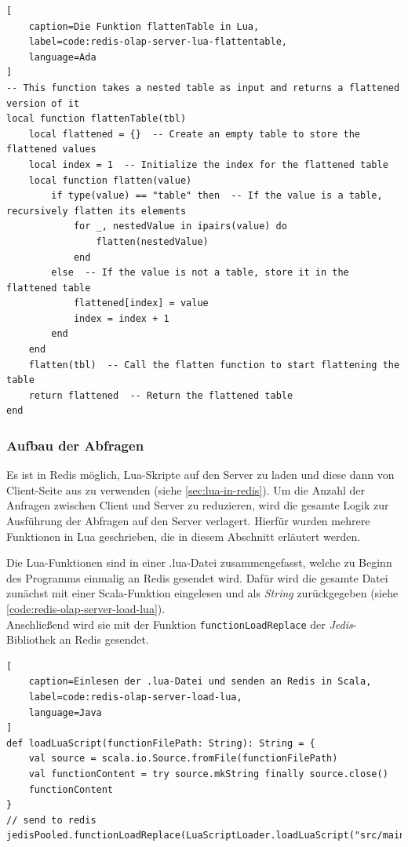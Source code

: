 \begin{lstlisting}[
    caption=Die Funktion flattenTable in Lua,
    label=code:redis-olap-server-lua-flattentable,
    language=Ada
]
-- This function takes a nested table as input and returns a flattened version of it
local function flattenTable(tbl)
    local flattened = {}  -- Create an empty table to store the flattened values
    local index = 1  -- Initialize the index for the flattened table
    local function flatten(value)
        if type(value) == "table" then  -- If the value is a table, recursively flatten its elements
            for _, nestedValue in ipairs(value) do
                flatten(nestedValue)
            end
        else  -- If the value is not a table, store it in the flattened table
            flattened[index] = value
            index = index + 1
        end
    end
    flatten(tbl)  -- Call the flatten function to start flattening the table
    return flattened  -- Return the flattened table
end
\end{lstlisting}


\subsubsection{Aufbau der Abfragen}
Es ist in Redis möglich, Lua-Skripte auf den Server zu laden und diese dann von Client-Seite aus zu verwenden (siehe \cref{sec:lua-in-redis}).
Um die Anzahl der Anfragen zwischen Client und Server zu reduzieren, wird die gesamte Logik zur Ausführung der Abfragen auf den Server verlagert. Hierfür wurden mehrere Funktionen in Lua geschrieben, die in diesem Abschnitt erläutert werden.

Die Lua-Funktionen sind in einer .lua-Datei zusammengefasst, welche zu Beginn des Programms einmalig an Redis gesendet wird. Dafür wird die gesamte Datei zunächst mit einer Scala-Funktion eingelesen und als \emph{String} zurückgegeben (siehe \cref{code:redis-olap-server-load-lua}).\\
Anschließend wird sie mit der Funktion \lstinline|functionLoadReplace| der \emph{Jedis}-Bibliothek an Redis gesendet.

\begin{lstlisting}[
    caption=Einlesen der .lua-Datei und senden an Redis in Scala,
    label=code:redis-olap-server-load-lua,
    language=Java
]
def loadLuaScript(functionFilePath: String): String = {
	val source = scala.io.Source.fromFile(functionFilePath)
	val functionContent = try source.mkString finally source.close()
	functionContent
}
// send to redis
jedisPooled.functionLoadReplace(LuaScriptLoader.loadLuaScript("src/main/resources/olaplibrary.lua"))
\end{lstlisting}





